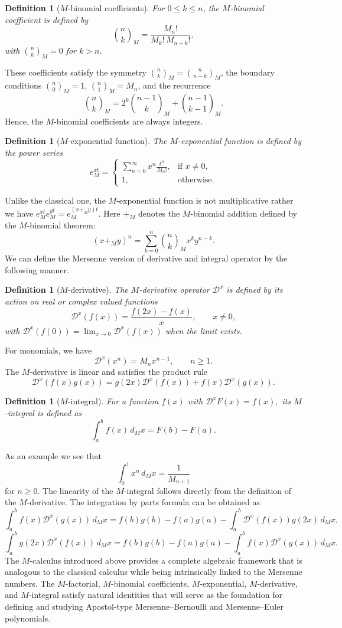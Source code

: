 \documentclass[10pt,a4paper]{amsart}
\newtheorem{definition}[theorem]{Definition}
\numberwithin{equation}{section}
\begin{document}
\begin{definition}[$M$-binomial coefficients]
For $0\le k\le n$, the $M$-binomial coefficient is defined by
\[
\binom{n}{k}_M = \frac{M_n!}{M_k!\,M_{n-k}!},
\]
with $\binom{n}{k}_M=0$ for $k>n$. 
\end{definition}
These coefficients satisfy the symmetry $\binom{n}{k}_M = \binom{n}{n-k}_M$, the boundary conditions $\binom{n}{0}_M=1$, $\binom{n}{1}_M=M_n$, and the recurrence
\[
\binom{n}{k}_M = 2^k\binom{n-1}{k}_M + \binom{n-1}{k-1}_M.
\]
Hence, the $M$-binomial coefficients are always integers.
\begin{definition}[$M$-exponential function]
The $M$-exponential function is defined by the power series
\[
e_M^{xt} = \begin{cases}
\displaystyle \sum_{n=0}^\infty x^n \frac{t^n}{M_n!}, & \text{if } x \neq 0,\\[1ex]
1, & \text{otherwise}.
\end{cases}
\]
\end{definition}
Unlike the classical one, the $M$-exponential function is not multiplicative rather we have $e_M^{xt}e_M^{yt}=e_M^{(x+_M y)t}.$ Here $+_M$ denotes the $M$-binomial addition defined by the $M$-binomial theorem:
\[
(x+_M y)^n = \sum_{k=0}^n \binom{n}{k}_M x^k y^{n-k}.
\]
We can define the Mersenne version of derivative and integral operator by the following manner.
\begin{definition}[$M$-derivative]
The $M$-derivative operator $\mathcal{D}^x$ is defined by its action on real or complex valued functions
\[
\mathcal{D}^x(f(x)) = \frac{f(2x)-f(x)}{x},\qquad x\neq 0,
\]
with $\mathcal{D}^x(f(0)) = \lim_{x\to 0}\mathcal{D}^x(f(x))$ when the limit exists.
\end{definition}
\noindent For monomials, we have
\[
\mathcal{D}^x(x^n) = M_n x^{n-1},\qquad n\ge 1.
\]
The $M$-derivative is linear and satisfies the product rule
\[
\mathcal{D}^x(f(x)g(x)) = g(2x)\mathcal{D}^x(f(x)) + f(x)\mathcal{D}^x(g(x)).
\]

\begin{definition}[$M$-integral]
For a function $f(x)$ with $\mathcal{D}^xF(x) = f(x),$ its $M$-integral is defined as
\[
\int_a^b f(x)\,d_M x = F(b)-F(a).
\]
\end{definition}
\noindent As an example we see that
\[
\int_0^1 x^{n}\,d_M x = \frac{1}{M_{n+1}}
\]
for $n\geq 0.$
\noindent The linearity of the $M$-integral follows directly from the definition of the $M$-derivative. The integration by parts formula can be obtained as
\[
\int_{a}^{b} f(x)\mathcal{D}^{x} (g(x))\,d_M x = f(b)g(b)-f(a)g(a)-\int_{a}^{b} \mathcal{D}^{x} (f(x)) g(2x)\,d_M x,
\]
\[
\int_{a}^{b} g(2x)\mathcal{D}^{x} (f(x)) \,d_M x = f(b)g(b)-f(a)g(a)-\int_{a}^{b} f(x)\mathcal{D}^{x} (g(x))\,d_M x.
\]
The $M$-calculus introduced above provides a complete algebraic framework that is analogous to the classical calculus while being intrinsically linked to the Mersenne numbers. The $M$-factorial, $M$-binomial coefficients, $M$-exponential, $M$-derivative, and $M$-integral satisfy natural identities that will serve as the foundation for defining and studying Apostol-type Mersenne–Bernoulli and Mersenne–Euler polynomials.
\end{document}
